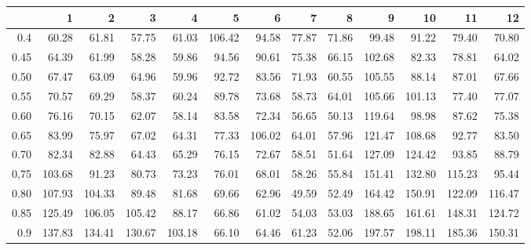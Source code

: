 \begin{table}[ht]
\centering
\begin{tabular}{rrrrrrrrrrrrr}
  \hline
 & 1 & 2 & 3 & 4 & 5 & 6 & 7 & 8 & 9 & 10 & 11 & 12 \\ 
  \hline
0.4 & 60.28 & 61.81 & 57.75 & 61.03 & 106.42 & 94.58 & 77.87 & 71.86 & 99.48 & 91.22 & 79.40 & 70.80 \\ 
  0.45 & 64.39 & 61.99 & 58.28 & 59.86 & 94.56 & 90.61 & 75.38 & 66.15 & 102.68 & 82.33 & 78.81 & 64.02 \\ 
  0.50 & 67.47 & 63.09 & 64.96 & 59.96 & 92.72 & 83.56 & 71.93 & 60.55 & 105.55 & 88.14 & 87.01 & 67.66 \\ 
  0.55 & 70.57 & 69.29 & 58.37 & 60.24 & 89.78 & 73.68 & 58.73 & 64.01 & 105.66 & 101.13 & 77.40 & 77.07 \\ 
  0.60 & 76.16 & 70.15 & 62.07 & 58.14 & 83.58 & 72.34 & 56.65 & 50.13 & 119.64 & 98.98 & 87.62 & 75.38 \\ 
  0.65 & 83.99 & 75.97 & 67.02 & 64.31 & 77.33 & 106.02 & 64.01 & 57.96 & 121.47 & 108.68 & 92.77 & 83.50 \\ 
  0.70 & 82.34 & 82.88 & 64.43 & 65.29 & 76.15 & 72.67 & 58.51 & 51.64 & 127.09 & 124.42 & 93.85 & 88.79 \\ 
  0,75 & 103.68 & 91.23 & 80.73 & 73.23 & 76.01 & 68.01 & 58.26 & 55.84 & 151.41 & 132.80 & 115.23 & 95.44 \\ 
  0.80 & 107.93 & 104.33 & 89.48 & 81.68 & 69.66 & 62.96 & 49.59 & 52.49 & 164.42 & 150.91 & 122.09 & 116.47 \\ 
  0.85 & 125.49 & 106.05 & 105.42 & 88.17 & 66.86 & 61.02 & 54.03 & 53.03 & 188.65 & 161.61 & 148.31 & 124.72 \\ 
  0.9 & 137.83 & 134.41 & 130.67 & 103.18 & 66.10 & 64.46 & 61.23 & 52.06 & 197.57 & 198.11 & 185.36 & 150.31 \\ 
   \hline
\end{tabular}
\end{table}
